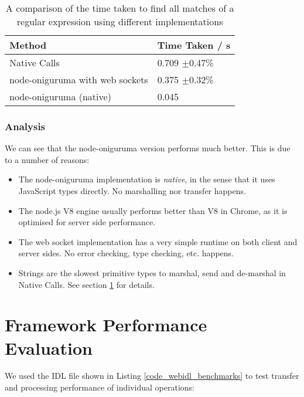 \begin{table}[h]
\begin{tabular}{l|l}
\textbf{Method}                 & \textbf{Time Taken / s} \\ \hline
Native Calls                    &  0.709 $\pm$0.47\%  \\
node-oniguruma with web sockets &  0.375 $\pm$0.32\%  \\
node-oniguruma (native)         &  0.045                  
\end{tabular}
\caption{A comparison of the time taken to find all matches of a regular expression using different implementations}
\label{table:onig_time_taken}
\end{table}


\subsubsection{Analysis} %
\label{ssub:onig_analysis}
We can see that the node-oniguruma version performs much better. This is due to a number of reasons:
\begin{itemize}
  \item The node-oniguruma implementation is \emph{native}, in the sense that it uses JavaScript types directly. No marshalling nor transfer happens.
  \item The node.js V8 engine usually performs better than V8 in Chrome, as it is optimised for server side performance.
  \item The web socket implementation has a very simple runtime on both client and server sides. No error checking, type checking, etc. happens.
  \item Strings are the slowest primitive types to marshal, send and de-marshal in Native Calls. See section \ref{sec:performance_evaluation} for details.
\end{itemize}



\section{Framework Performance Evaluation} %
\label{sec:performance_evaluation}
We used the IDL file shown in Listing \ref{code_webidl_benchmarks} to test transfer and processing performance of individual operations:

